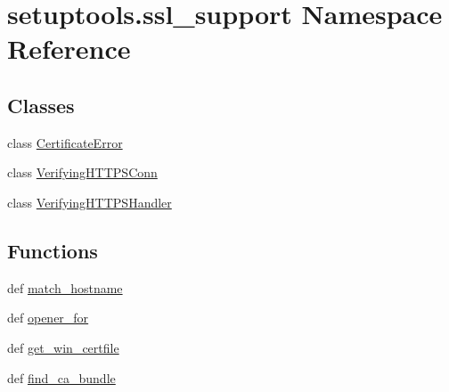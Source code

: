 \hypertarget{namespacesetuptools_1_1ssl__support}{}\section{setuptools.\+ssl\+\_\+support Namespace Reference}
\label{namespacesetuptools_1_1ssl__support}
\subsection*{Classes}
\begin{DoxyCompactItemize}
\item 
class \hyperlink{classsetuptools_1_1ssl__support_1_1CertificateError}{Certificate\+Error}
\item 
class \hyperlink{classsetuptools_1_1ssl__support_1_1VerifyingHTTPSConn}{Verifying\+H\+T\+T\+P\+S\+Conn}
\item 
class \hyperlink{classsetuptools_1_1ssl__support_1_1VerifyingHTTPSHandler}{Verifying\+H\+T\+T\+P\+S\+Handler}
\end{DoxyCompactItemize}
\subsection*{Functions}
\begin{DoxyCompactItemize}
\item 
def \hyperlink{namespacesetuptools_1_1ssl__support_aea1a8757f01fb38e53c6d9c98485cec4}{match\+\_\+hostname}
\item 
def \hyperlink{namespacesetuptools_1_1ssl__support_a68e5c1e920914070ef0c6ecaec59e407}{opener\+\_\+for}
\item 
def \hyperlink{namespacesetuptools_1_1ssl__support_a388158142ebc66e6b47326fb18daabff}{get\+\_\+win\+\_\+certfile}
\item 
def \hyperlink{namespacesetuptools_1_1ssl__support_a03a661db916251b69874be9cafd6073e}{find\+\_\+ca\+\_\+bundle}
\end{DoxyCompactItemize}
